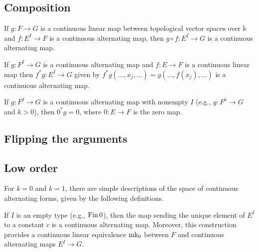 
\subsection{Composition}%
\label{sec:composition}

\begin{theorem}%
  \label{thm:clm-comp}
  If \(g\colon F \to G\) is a continuous linear map between topological vector spaces over \(\mathbb k\)
  and \(f\colon E^{I} \to F\) is a continuous alternating map,
  then \(g \circ f\colon E^{I}\to G\) is a continuous alternating map.
\end{theorem}

\begin{theorem}%
  \label{thm:comp-clm}
  If \(g\colon F^{I} \to G\) is a continuous alternating map
  and \(f\colon E \to F\) is a continuous linear map
  then \(f^{*}g \colon E^{I} \to G\) given by \(f^{*}g(\dots, x_{j}, \dots) = g (\dots, f(x_{j}), \dots)\) is a continuous alternating map.
\end{theorem}

\begin{lemma}%
  \label{lem:comp-clm-zero}
  If \(g\colon F^{I} \to G\) is a continuous alternating map with nonempty \(I\)
  (e.g., \(g\colon F^{k}\to G\) and \(k > 0\)),
  then \(0^{*}g = 0\), where \(0\colon E \to F\) is the zero map.
\end{lemma}

\subsection{Flipping the arguments}%
\label{sec:flipping-arguments}


\subsection{Low order}%
\label{sec:low-order}

For \(k = 0\) and \(k = 1\), there are simple descriptions of the space of continuous alternating forms,
given by the following definitions.

\begin{definition}%
  \label{def:cont-alt-map-zero}
  If \(I\) is an empty type (e.g., \(\operatorname{Fin} 0\)),
  then the map sending the unique element of \(E^{I}\) to a constant \(c\)
  is a continuous alternating map.
  Moreover, this construction provides a continuous linear equivalence \(\operatorname{mk_0}\)
  between \(F\) and continuous alternating maps \(E^{I} \to G\).
\end{definition}

